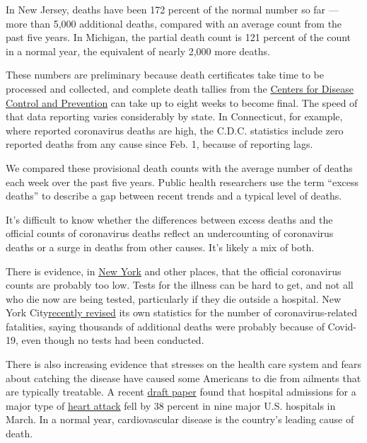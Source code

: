 In New Jersey, deaths have been 172 percent of the normal number so far
--- more than 5,000 additional deaths, compared with an average count
from the past five years. In Michigan, the partial death count is 121
percent of the count in a normal year, the equivalent of nearly 2,000
more deaths.

These numbers are preliminary because death certificates take time to be
processed and collected, and complete death tallies from the
\href{https://www.cdc.gov/nchs/nvss/vsrr/covid19/index.htm}{Centers for
Disease Control and Prevention} can take up to eight weeks to become
final. The speed of that data reporting varies considerably by state. In
Connecticut, for example, where reported coronavirus deaths are high,
the C.D.C. statistics include zero reported deaths from any cause since
Feb. 1, because of reporting lags.

We compared these provisional death counts with the average number of
deaths each week over the past five years. Public health researchers use
the term ``excess deaths'' to describe a gap between recent trends and a
typical level of deaths.

It's difficult to know whether the differences between excess deaths and
the official counts of coronavirus deaths reflect an undercounting of
coronavirus deaths or a surge in deaths from other causes. It's likely a
mix of both.

There is evidence, in
\href{https://www.nytimes.com/interactive/2020/04/10/upshot/coronavirus-deaths-new-york-city.html}{New
York} and other places, that the official coronavirus counts are
probably too low. Tests for the illness can be hard to get, and not all
who die now are being tested, particularly if they die outside a
hospital. New York
City\href{https://www.nytimes.com/2020/04/14/nyregion/new-york-coronavirus-deaths.html}{recently
revised} its own statistics for the number of coronavirus-related
fatalities, saying thousands of additional deaths were probably because
of Covid-19, even though no tests had been conducted.

There is also increasing evidence that stresses on the health care
system and fears about catching the disease have caused some Americans
to die from ailments that are typically treatable. A recent
\href{http://www.onlinejacc.org/content/accj/early/2020/04/07/j.jacc.2020.04.011.full.pdf}{draft
paper} found that hospital admissions for a major type of
\href{https://www.nytimes.com/2020/04/06/well/live/coronavirus-doctors-hospitals-emergency-care-heart-attack-stroke.html}{heart
attack} fell by 38 percent in nine major U.S. hospitals in March. In a
normal year, cardiovascular disease is the country's leading cause of
death.

